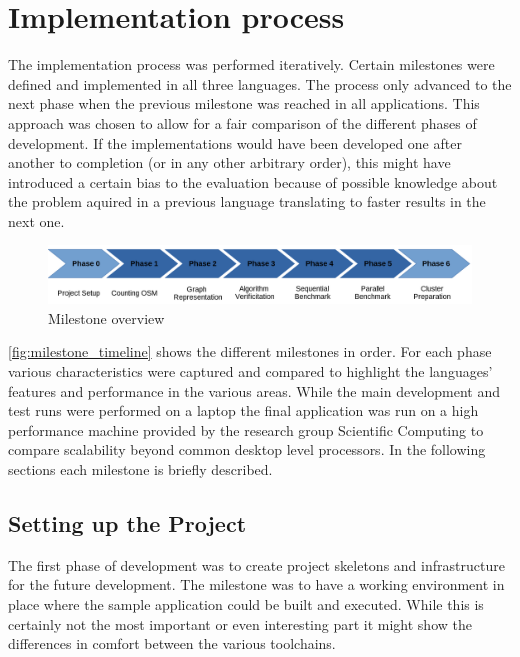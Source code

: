 \section{Implementation process}
\label{sec:Concept::Implementation}

The implementation process was performed iteratively. Certain milestones were defined and implemented in all three languages. The process only advanced to the next phase when the previous milestone was reached in all applications. This approach was chosen to allow for a fair comparison of the different phases of development. If the implementations would have been developed one after another to completion (or in any other arbitrary order), this might have introduced a certain bias to the evaluation because of possible knowledge about the problem aquired in a previous language translating to faster results in the next one.

\begin{figure}[htb]
    \centering
    \includegraphics[width=\textwidth]{img/milestone_timeline.png}
    \caption{Milestone overview}
    \label{fig:milestone_timeline}
\end{figure}

\autoref{fig:milestone_timeline} shows the different milestones in order. For each phase various characteristics were captured and compared to highlight the languages' features and performance in the various areas. While the main development and test runs were performed on a laptop the final application was run on a high performance machine provided by the research group Scientific Computing to compare scalability beyond common desktop level processors. In the following sections each milestone is briefly described.

\subsection*{Setting up the Project}
\label{subsec:Concept::Implementation::Setup}

The first phase of development was to create project skeletons and infrastructure for the future development. The milestone was to have a working environment in place where the sample application could be built and executed. While this is certainly not the most important or even interesting part it might show the differences in comfort between the various toolchains.

